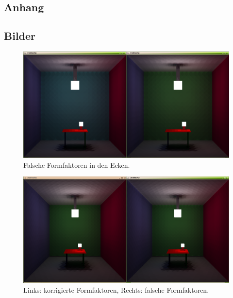 \documentclass[final,a4paper,11pt,notitlepage,halfparskip]{scrreprt}
\begin{document}
\begin{appendix}
\chapter{Anhang}
\section{Bilder}
  \begin{figure}[htb]
    \centering
    \includegraphics[width=12cm]{img/wrong_ff.png}
    \caption{Falsche Formfaktoren in den Ecken.}
    \label{fig:ff_corner}
  \end{figure}
  \begin{figure}[htb]
    \centering
    \includegraphics[width=12cm]{img/correct_ff.png}
    \caption{Links: korrigierte Formfaktoren, Rechts: falsche
    Formfaktoren.}
    \label{fig:ff_correct}
  \end{figure}
\end{appendix}
\end{document}
